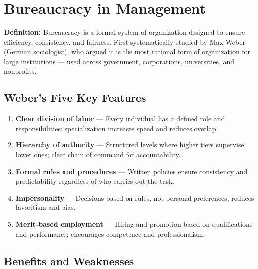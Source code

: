 \documentclass[11pt, letterpaper]{article}
\begin{document}
\newpage

\section{Bureaucracy in Management}

\begin{defbox}
\textbf{Definition:} Bureaucracy is a formal system of organization designed to ensure efficiency, consistency, and fairness. First systematically studied by Max Weber (German sociologist), who argued it is the most rational form of organization for large institutions --- used across government, corporations, universities, and nonprofits.
\end{defbox}

\subsection{Weber's Five Key Features}

\begin{enumerate}[leftmargin=*, label=\textbf{\arabic*.}]
  \item \textbf{Clear division of labor} --- Every individual has a defined role and responsibilities; specialization increases speed and reduces overlap.
  \item \textbf{Hierarchy of authority} --- Structured levels where higher tiers supervise lower ones; clear chain of command for accountability.
  \item \textbf{Formal rules and procedures} --- Written policies ensure consistency and predictability regardless of who carries out the task.
  \item \textbf{Impersonality} --- Decisions based on rules, not personal preferences; reduces favoritism and bias.
  \item \textbf{Merit-based employment} --- Hiring and promotion based on qualifications and performance; encourages competence and professionalism.
\end{enumerate}

\subsection{Benefits and Weaknesses}
\end{document}
